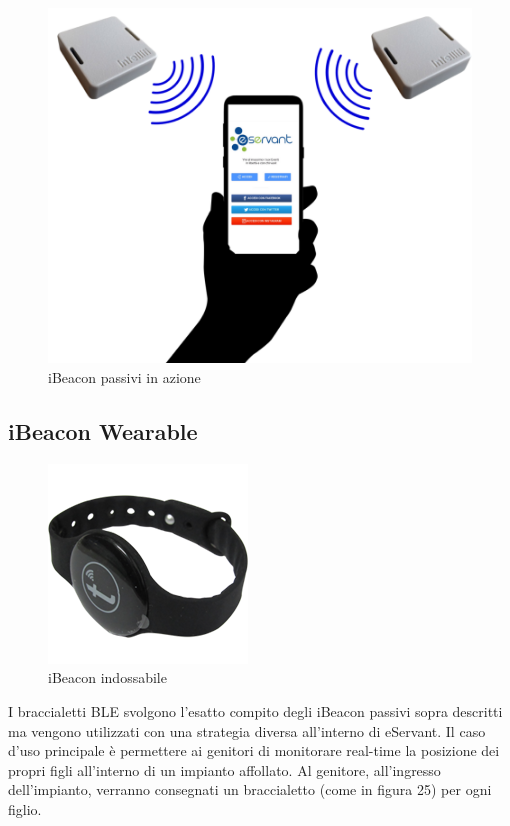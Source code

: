 \begin{figure}[H]
    \centering  
    \caption{iBeacon passivi in azione}
    \includegraphics[scale=0.4]{img/cap4/ibeacon-advertising}
\end{figure}

\subsection{iBeacon Wearable}
\begin{figure}[H]
    \centering  
    \caption{iBeacon indossabile}
    \includegraphics[scale=0.4]{img/cap4/wearable}
\end{figure}
I braccialetti BLE svolgono l'esatto compito degli iBeacon passivi sopra descritti ma vengono utilizzati
con una strategia diversa all'interno di eServant.
Il caso d'uso principale è permettere ai genitori di monitorare real-time la posizione dei propri
figli all'interno di un impianto affollato.
Al genitore, all'ingresso dell'impianto, verranno consegnati un braccialetto (come in figura 25) per ogni figlio.

